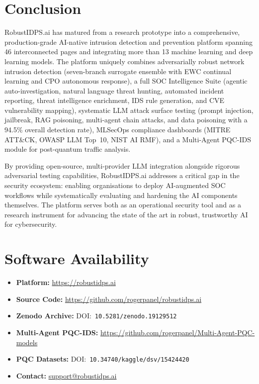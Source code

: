 \documentclass[11pt,a4paper]{article}
\begin{document}
\section{Conclusion}
\label{sec:conclusion}

RobustIDPS.ai has matured from a research prototype into a comprehensive,
production-grade AI-native intrusion detection and prevention platform
spanning 46 interconnected pages and integrating more than 13 machine
learning and deep learning models.  The platform uniquely combines
adversarially robust network intrusion detection (seven-branch surrogate
ensemble with EWC continual learning and CPO autonomous response),
a full SOC Intelligence Suite (agentic auto-investigation, natural language
threat hunting, automated incident reporting, threat intelligence
enrichment, IDS rule generation, and CVE vulnerability mapping),
systematic LLM attack surface testing (prompt injection, jailbreak,
RAG poisoning, multi-agent chain attacks, and data poisoning with a
94.5\% overall detection rate), MLSecOps compliance dashboards (MITRE
ATT\&CK, OWASP LLM Top~10, NIST AI RMF), and a Multi-Agent PQC-IDS
module for post-quantum traffic analysis.

By providing open-source, multi-provider LLM integration alongside
rigorous adversarial testing capabilities, RobustIDPS.ai addresses
a critical gap in the security ecosystem: enabling organisations to
deploy AI-augmented SOC workflows while systematically evaluating and
hardening the AI components themselves.  The platform serves both as
an operational security tool and as a research instrument for advancing
the state of the art in robust, trustworthy AI for cybersecurity.

\section*{Software Availability}

\begin{itemize}
  \item \textbf{Platform:} \url{https://robustidps.ai}
  \item \textbf{Source Code:} \url{https://github.com/rogerpanel/robustidps.ai}
  \item \textbf{Zenodo Archive:} DOI:~\texttt{10.5281/zenodo.19129512}
  \item \textbf{Multi-Agent PQC-IDS:} \url{https://github.com/rogerpanel/Multi-Agent-PQC-models}
  \item \textbf{PQC Datasets:} DOI:~\texttt{10.34740/kaggle/dsv/15424420}
  \item \textbf{Contact:} \href{mailto:support@robustidps.ai}{support@robustidps.ai}
\end{itemize}
\end{document}
